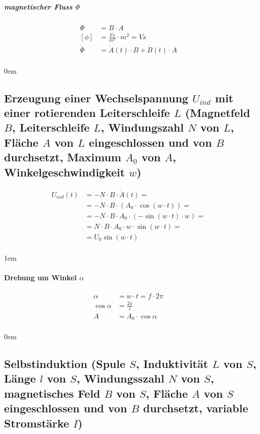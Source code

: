 \subparagraph{magnetischer Fluss $\Phi$}

\begin{align*}
  \Phi &= B \cdot A &\\
  [\phi] &= \frac{Vs}{m^2} \cdot m^2 = Vs &\\
  \dot{\Phi} &= \dot{A} \left( t \right) \cdot B + \dot{B} \left( t \right) \cdot A &\\
\end{align*}

\leftskip0em

\subsection{Erzeugung einer Wechselspannung $U_{ind}$ mit einer rotierenden Leiterschleife $L$
(Magnetfeld $B$, Leiterschleife $L$, Windungszahl $N$ von $L$, Fläche $A$ von $L$ eingeschlossen und von $B$
durchsetzt, Maximum $A_0$ von $A$, Winkelgeschwindigkeit $w$)}

\begin{align*}
  U_{ind} \left( t \right) &= -N \cdot B \cdot \dot{A} \left( t \right) = &\\
  &= -N \cdot B \cdot \left( A_0 \cdot \dot{\cos} \left( w \cdot t \right) \right) = &\\
  &= -N \cdot B \cdot A_0 \cdot \left( - \sin \left( w \cdot t \right) \cdot w \right) = &\\
  &= N \cdot B \cdot A_0 \cdot w \cdot \sin \left( w \cdot t\right) = &\\
  &= U_0 \sin \left( w \cdot t \right) &\\
\end{align*}

\leftskip1em
\paragraph{Drehung um Winkel $\alpha$}

\begin{align*}
  \alpha &= w \cdot t = f \cdot 2 \pi &\\
  \cos \alpha &= \frac{2x}{l} &\\
  A &= A_0 \cdot \cos \alpha &\\
\end{align*}

\leftskip0em

\subsection{Selbstinduktion (Spule $S$, Induktivität $L$ von $S$, Länge $l$ von $S$, Windungsszahl
$N$ von $S$, magnetisches Feld $B$ von $S$, Fläche $A$ von $S$ eingeschlossen und von $B$
durchsetzt, variable Stromstärke $I$)}


